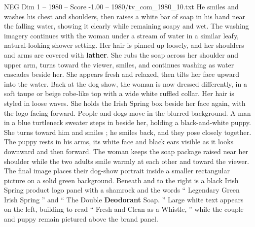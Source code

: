 \begin{textsample}{NEG Dim 1 – 1980 – Score -1.00 – 1980/tv\_com\_1980\_10.txt}
He smiles and washes his chest and shoulders, then raises a white bar of soap in his hand near the falling water, showing it clearly while remaining soapy and wet.
The washing imagery continues with the woman under a stream of water in a similar leafy, natural-looking shower setting.
Her hair is pinned up loosely, and her shoulders and arms are covered with \textbf{lather}.
She rubs the soap across her shoulder and upper arm, turns toward the viewer, smiles, and continues washing as water cascades beside her.
She appears fresh and relaxed, then tilts her face upward into the water.
Back at the dog show, the woman is now dressed differently, in a soft taupe or beige robe-like top with a wide white ruffled collar.
Her hair is styled in loose waves.
She holds the Irish Spring box beside her face again, with the logo facing forward.
People and dogs move in the blurred background.
A man in a blue turtleneck sweater steps in beside her, holding a black-and-white puppy.
She turns toward him and smiles ; he smiles back, and they pose closely together.
The puppy rests in his arms, its white face and black ears visible as it looks downward and then forward.
The woman keeps the soap package raised near her shoulder while the two adults smile warmly at each other and toward the viewer.
The final image places their dog-show portrait inside a smaller rectangular picture on a solid green background.
Beneath and to the right is a black Irish Spring product logo panel with a shamrock and the words “ Legendary Green Irish Spring ” and “ The Double \textbf{Deodorant} Soap. ” Large white text appears on the left, building to read “ Fresh and Clean as a Whistle, ” while the couple and puppy remain pictured above the brand panel.

\end{textsample}
